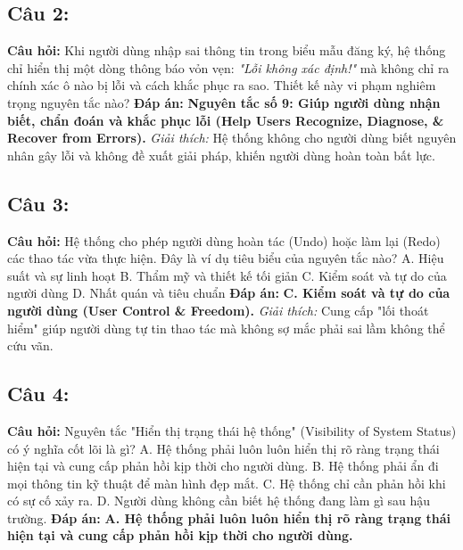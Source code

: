 \documentclass[11pt,a4paper,oneside]{report}
\begin{document}
\subsection{Câu 2:}
\begin{myquote}
\textbf{Câu hỏi:} Khi người dùng nhập sai thông tin trong biểu mẫu đăng ký, hệ thống chỉ hiển thị một dòng thông báo vỏn vẹn: \textit{"Lỗi không xác định!"} mà không chỉ ra chính xác ô nào bị lỗi và cách khắc phục ra sao. Thiết kế này vi phạm nghiêm trọng nguyên tắc nào?
\textbf{Đáp án:} \textbf{Nguyên tắc số 9: Giúp người dùng nhận biết, chẩn đoán và khắc phục lỗi (Help Users Recognize, Diagnose, \& Recover from Errors).}
\textit{Giải thích:} Hệ thống không cho người dùng biết nguyên nhân gây lỗi và không đề xuất giải pháp, khiến người dùng hoàn toàn bất lực.
\end{myquote}

\subsection{Câu 3:}
\begin{myquote}
\textbf{Câu hỏi:} Hệ thống cho phép người dùng hoàn tác (Undo) hoặc làm lại (Redo) các thao tác vừa thực hiện. Đây là ví dụ tiêu biểu của nguyên tắc nào?
A. Hiệu suất và sự linh hoạt
B. Thẩm mỹ và thiết kế tối giản
C. Kiểm soát và tự do của người dùng
D. Nhất quán và tiêu chuẩn
\textbf{Đáp án:} \textbf{C. Kiểm soát và tự do của người dùng (User Control \& Freedom).}
\textit{Giải thích:} Cung cấp "lối thoát hiểm" giúp người dùng tự tin thao tác mà không sợ mắc phải sai lầm không thể cứu vãn.
\end{myquote}

\subsection{Câu 4:}
\begin{myquote}
\textbf{Câu hỏi:} Nguyên tắc "Hiển thị trạng thái hệ thống" (Visibility of System Status) có ý nghĩa cốt lõi là gì?
A. Hệ thống phải luôn luôn hiển thị rõ ràng trạng thái hiện tại và cung cấp phản hồi kịp thời cho người dùng.
B. Hệ thống phải ẩn đi mọi thông tin kỹ thuật để màn hình đẹp mắt.
C. Hệ thống chỉ cần phản hồi khi có sự cố xảy ra.
D. Người dùng không cần biết hệ thống đang làm gì sau hậu trường.
\textbf{Đáp án:} \textbf{A. Hệ thống phải luôn luôn hiển thị rõ ràng trạng thái hiện tại và cung cấp phản hồi kịp thời cho người dùng.}
\end{myquote}
\end{document}
